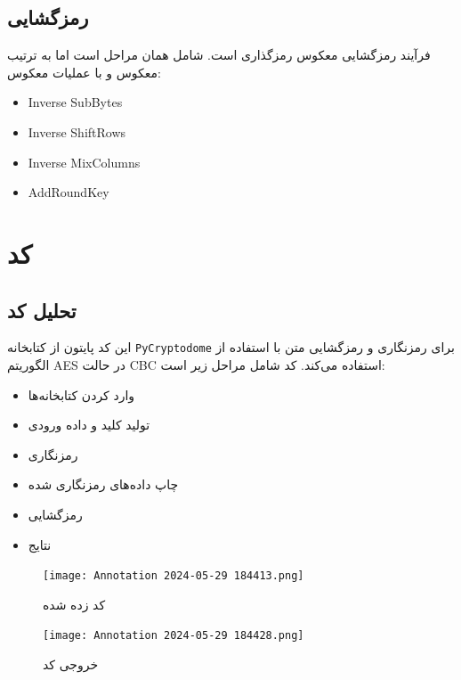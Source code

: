\documentclass[11pt]{article}
\begin{document}
\subsection*{رمزگشایی}
فرآیند رمزگشایی معکوس رمزگذاری است. شامل همان مراحل است اما به ترتیب معکوس و با عملیات معکوس:
\begin{itemize}
    \item Inverse SubBytes
    \item Inverse ShiftRows
    \item Inverse MixColumns
    \item AddRoundKey
\end{itemize}

\section*{کد}

\subsection*{تحلیل کد}

این کد پایتون از کتابخانه \texttt{PyCryptodome} برای رمزنگاری و رمزگشایی متن با استفاده از الگوریتم AES در حالت CBC استفاده می‌کند. کد شامل مراحل زیر است:


\begin{itemize}
    \item وارد کردن کتابخانه‌ها
    \item تولید کلید و داده ورودی
    \item رمزنگاری
    \item چاپ داده‌های رمزنگاری شده
    \item رمزگشایی
    \item نتایج
\end{itemize}


\begin{figure}
    \centering
    \texttt{[image: Annotation 2024-05-29 184413.png]}
    \caption{کد زده شده}
    \label{fig:enter-label}
\end{figure}

\begin{figure}
    \centering
    \texttt{[image: Annotation 2024-05-29 184428.png]}
    \caption{خروجی کد}
    \label{fig:enter-label}
\end{figure}
\end{document}
